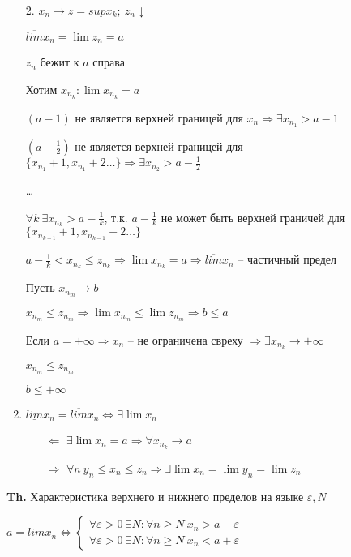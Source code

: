 \documentclass[14pt, letter paper]{article}
\begin{document}
\begin{enumerate}
    \item[2.] $x_n \rightarrow z = sup x_k;\ z_n \downarrow$

    $\overline{lim} x_n = \lim{z_n} = a$

    $z_n$ бежит к $a$ справа

    Хотим $x_{n_k} : \lim{x_{n_k}} = a$

    $(a - 1)$ не является верхней границей для $x_n \Rightarrow \exists x_{n_1} > a - 1$

    $(a - \frac{1}{2})$ не является верхней границей для $\{x_{n_1} + 1, x_{n_1} + 2 \ldots\} \Rightarrow \exists x_{n_2} > a - \frac{1}{2}$

    \ldots

    $\forall k\ \exists x_{n_k} > a - \frac{1}{k}$, т.к. $a - \frac{1}{k}$ не может быть верхней граничей для $\{x_{n_{k-1}} + 1, x_{n_{k-1}} + 2 \ldots \}$

    $a - \frac{1}{k} < x_{n_k} \leq z_{n_k} \Rightarrow \lim{x_{n_k}} = a \Rightarrow \overline{lim}x_n$ -- частичный предел

    Пусть $x_{n_m} \rightarrow b$

    $x_{n_m} \leq z_{n_m} \Rightarrow \lim{x_{n_m}} \leq \lim{z_{n_m}} \Rightarrow b \leq a$

    Если $a = + \infty \Rightarrow x_n$ -- не ограничена свреху $\Rightarrow \exists x_{n_k} \rightarrow + \infty$

    $x_{n_m} \leq z_{n_m}$

    $b \leq + \infty$

    \item $\underline{lim}x_n = \overline{lim}x_n \Leftrightarrow \exists \lim{x_n}$

    \begin{itemize}
        \item[$\Leftarrow$] $\exists \lim{x_n} = a \Rightarrow \forall x_{n_k} \rightarrow a$

        \item[$\Rightarrow$] $\forall n\ y_n \leq x_n \leq z_n \Rightarrow \exists \lim{x_n} = \lim{y_n} = \lim{z_n}$
    \end{itemize}
\end{enumerate}

\textbf{Th.} Характеристика верхнего и нижнего пределов на языке $\varepsilon, N$

$a = \underline{lim}x_n \Leftrightarrow \begin{cases}
    \forall \varepsilon > 0\ \exists N : \forall n \geq N\ x_n > a - \varepsilon \\
    \forall \varepsilon > 0\ \exists N : \forall n \geq N\ x_n < a + \varepsilon
\end{cases}$
\end{document}
